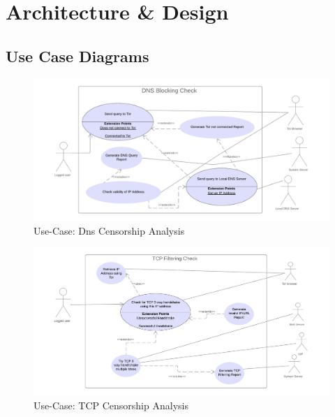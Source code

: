 \documentclass[12pt]{article}
\begin{document}
\section{Architecture \& Design}
\subsection{Use Case Diagrams}
\begin{figure}[H]
    \centering
    \includegraphics[width=\textwidth]{Diagrams/ucdns.png}
    \caption{Use-Case: Dns Censorship Analysis}
    \label{fig:ucdns}
\end{figure}

\begin{figure}[H]
    \centering
    \includegraphics[width=\textwidth]{Diagrams/uctcp.png}
    \caption{Use-Case: TCP Censorship Analysis}
    \label{fig:ucdns}
\end{figure}
\end{document}
